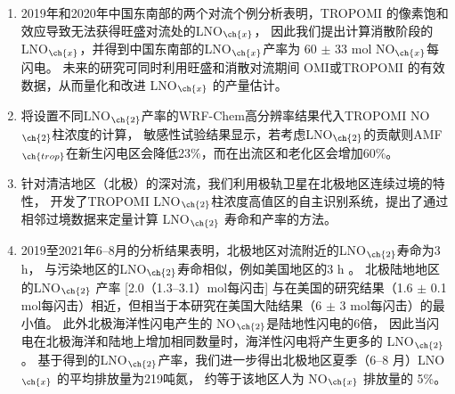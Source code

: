 \begin{enumerate}[label=（\arabic*）, labelindent=\parindent, nosep, leftmargin=0pt, widest=0, itemindent=*, topsep=0pt, partopsep=0pt, parsep=0pt]

\item 2019年和2020年中国东南部的两个对流个例分析表明，TROPOMI 的像素饱和效应导致无法获得旺盛对流处的LNO$_{\ch{x}}$，
因此我们提出计算消散阶段的LNO$_{\ch{x}}$，并得到中国东南部的LNO$_{\ch{x}}$产率为 60 $\pm$ 33 mol NO$_{\ch{x}}$每闪电。
未来的研究可同时利用旺盛和消散对流期间 OMI或TROPOMI 的有效数据，从而量化和改进 LNO$_{\ch{x}}$ 的产量估计。

\item 将设置不同LNO$_{\ch{2}}$产率的WRF-Chem高分辨率结果代入TROPOMI NO$_{\ch{2}}$柱浓度的计算，
敏感性试验结果显示，若考虑LNO$_{\ch{2}}$的贡献则AMF$_{\ch{trop}}$在新生闪电区会降低23\%，而在出流区和老化区会增加60\%。

\item 针对清洁地区（北极）的深对流，我们利用极轨卫星在北极地区连续过境的特性，
开发了TROPOMI LNO$_{\ch{2}}$柱浓度高值区的自主识别系统，提出了通过相邻过境数据来定量计算 LNO$_{\ch{2}}$ 寿命和产率的方法。

\item 2019至2021年6--8月的分析结果表明，北极地区对流附近的LNO$_{\ch{2}}$寿命为3 h，
与污染地区的LNO$_{\ch{2}}$寿命相似，例如美国地区的3 h \citep{Nault.2017}。
北极陆地地区的LNO$_{\ch{2}}$ 产率 [2.0（1.3--3.1）mol每闪击] 与\citet{Lapierre.2020}在美国的研究结果（1.6 $\pm$ 0.1 mol每闪击）相近，但相当于本研究在美国大陆结果（6 $\pm$ 3 mol每闪击）的最小值。
此外北极海洋性闪电产生的 NO$_{\ch{2}}$是陆地性闪电的6倍，
因此当闪电在北极海洋和陆地上增加相同数量时，海洋性闪电将产生更多的 LNO$_{\ch{2}}$。
基于得到的LNO$_{\ch{2}}$产率，我们进一步得出北极地区夏季（6--8 月）LNO$_{\ch{x}}$ 的平均排放量为219吨氮，
约等于该地区人为 NO$_{\ch{x}}$ 排放量的 5\%。

\end{enumerate}


